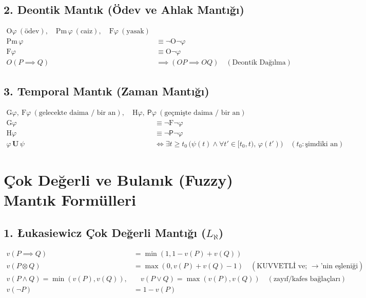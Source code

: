 \documentclass[11pt, a4paper]{article}
\begin{document}
\subsection{2. Deontik Mantık (Ödev ve Ahlak Mantığı)}
\begin{align}
\mathrm{O}\varphi \ (\text{ödev}), \quad \mathrm{Pm}\,\varphi \ (\text{caiz}), \quad \mathrm{F}\varphi \ (\text{yasak}) \\
\mathrm{Pm}\,\varphi &\equiv \neg \mathrm{O} \neg \varphi \\
\mathrm{F}\varphi &\equiv \mathrm{O} \neg \varphi \\
O(P \implies Q) &\implies (O P \implies O Q) \quad (\text{Deontik Dağılma})
\end{align}

\subsection{3. Temporal Mantık (Zaman Mantığı)}
\begin{align}
\mathrm{G}\varphi, \ \mathrm{F}\varphi \ (\text{gelecekte daima / bir an}), \quad \mathrm{H}\varphi, \ \mathsf{P}\varphi \ (\text{geçmişte daima / bir an}) \\
\mathrm{G}\varphi &\equiv \neg \mathrm{F} \neg \varphi \\
\mathrm{H}\varphi &\equiv \neg \mathsf{P} \neg \varphi \\
\varphi \, \mathbf{U} \, \psi &\iff \exists t \ge t_0 \, \big( \psi(t) \land \forall t' \in [t_0, t), \, \varphi(t') \big) \quad (t_0: \text{şimdiki an})
\end{align}

\section{Çok Değerli ve Bulanık (Fuzzy) Mantık Formülleri}

\subsection{1. Łukasiewicz Çok Değerli Mantığı ($L_{\aleph}$)}
\begin{align}
v(P \implies Q) &= \min(1, 1 - v(P) + v(Q)) \\
v(P \otimes Q) &= \max(0, v(P) + v(Q) - 1) \quad (\text{KUVVETLİ ve; } \to \text{'nin eşleniği}) \\
v(P \land Q) = \min(v(P), v(Q)), &\quad v(P \lor Q) = \max(v(P), v(Q)) \quad (\text{zayıf/kafes bağlaçları}) \\
v(\neg P) &= 1 - v(P)
\end{align}
\end{document}
